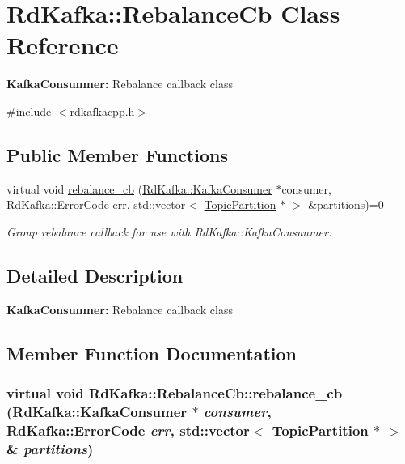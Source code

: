 \hypertarget{classRdKafka_1_1RebalanceCb}{
\section{RdKafka::RebalanceCb Class Reference}
\label{classRdKafka_1_1RebalanceCb}
}


{\bfseries KafkaConsunmer:} Rebalance callback class  


{\ttfamily \#include $<$rdkafkacpp.h$>$}\subsection*{Public Member Functions}
\begin{DoxyCompactItemize}
\item 
virtual void \hyperlink{classRdKafka_1_1RebalanceCb_a490a91c52724382a72380af621958741}{rebalance\_\-cb} (\hyperlink{classRdKafka_1_1KafkaConsumer}{RdKafka::KafkaConsumer} $\ast$consumer, RdKafka::ErrorCode err, std::vector$<$ \hyperlink{classRdKafka_1_1TopicPartition}{TopicPartition} $\ast$ $>$ \&partitions)=0
\begin{DoxyCompactList}\small\item\em Group rebalance callback for use with RdKafka::KafkaConsunmer. \item\end{DoxyCompactList}\end{DoxyCompactItemize}


\subsection{Detailed Description}
{\bfseries KafkaConsunmer:} Rebalance callback class 

\subsection{Member Function Documentation}
\hypertarget{classRdKafka_1_1RebalanceCb_a490a91c52724382a72380af621958741}{
\subsubsection[{rebalance\_\-cb}]{\setlength{\rightskip}{0pt plus 5cm}virtual void RdKafka::RebalanceCb::rebalance\_\-cb ({\bf RdKafka::KafkaConsumer} $\ast$ {\em consumer}, \/  RdKafka::ErrorCode {\em err}, \/  std::vector$<$ {\bf TopicPartition} $\ast$ $>$ \& {\em partitions})}}
\label{classRdKafka_1_1RebalanceCb_a490a91c52724382a72380af621958741}


